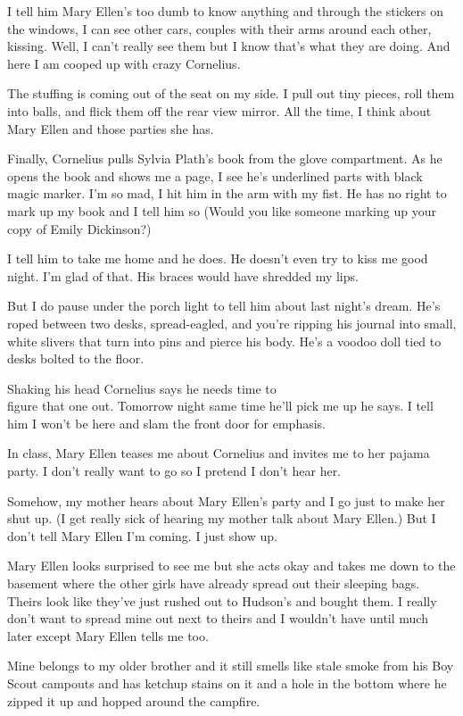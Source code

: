 \documentclass[twoside,10pt]{book}
\begin{document}
I tell him Mary Ellen's too dumb to know anything and through the
stickers on the windows, I can see other cars, couples with their arms
around each other, kissing. Well, I can't really see them but I know
that's what they are doing. And here I am cooped up with crazy
Cornelius.

The stuffing is coming out of the seat on my side. I pull out tiny
pieces, roll them into balls, and flick them off the rear view mirror.
All the time, I think about Mary Ellen and those parties she has.

Finally, Cornelius pulls Sylvia Plath's book from the glove compartment.
As he opens the book and shows me a page, I see he's underlined parts
with black magic marker. I'm so mad, I hit him in the arm with my fist.
He has no right to mark up my book and I tell him so (Would you like
some­one marking up your copy of Emily Dickinson?)

I tell him to take me home and he does. He doesn't even try to kiss me
good night. I'm glad of that. His braces would have shredded my lips.

But I do pause under the porch light to tell him about last night's
dream. He's roped between two desks, spread-eagled, and you're ripping
his journal into small, white slivers that turn into pins and pierce his
body. He's a voodoo doll tied to desks bolted to the floor.

Shaking his head Cornelius says he needs time to\\
figure that one out. Tomorrow night same time he'll pick me up he says.
I tell him I won't be here and slam the front door for emphasis.

In class, Mary Ellen teases me about Cornelius and invites me to her
pajama party. I don't really want to go so I pretend I don't hear her.

Somehow, my mother hears about Mary Ellen's party and I go just to make
her shut up. (I get really sick of hearing my mother talk about Mary
Ellen.) But I don't tell Mary Ellen I'm coming. I just show up.

Mary Ellen looks surprised to see me but she acts okay and takes me down
to the basement where the other girls have already spread out their
sleeping bags. Theirs look like they've just rushed out to Hudson's and
bought them. I really don't want to spread mine out next to theirs and I
wouldn't have until much later except Mary Ellen tells me too.

Mine belongs to my older brother and it still smells like stale smoke
from his Boy Scout campouts and has ketchup stains on it and a hole in
the bottom where he zipped it up and hopped around the campfire.
\end{document}
